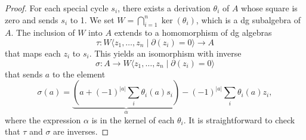 \documentclass[10pt,a4paper]{amsart}
\begin{document}
\begin{proof}
    For each special cycle $s_i$, there exists a derivation $\theta_i$ of $A$ whose square is zero and sends $s_i$ to 1. We set $W = \bigcap_{i=1}^{n} \ker(\theta_i)$, which is a dg subalgebra of $A$. The inclusion of $W$ into $A$ extends to a homomorphism of dg algebras 
    \[
    \tau: W\langle z_1, \ldots, z_n \mid \partial(z_i)=0 \rangle \to A
    \]
    that  maps each $z_i$ to $s_i$. This yields an isomorphism with inverse
    \[ 
    \sigma: A \to W\langle z_1, \ldots, z_n \mid \partial(z_i)=0 \rangle
    \]
    that sends $a$ to the element
    \[
    \sigma(a)= \underbrace{(a + (-1)^{|a|} \sum_{i}\theta_i(a)s_i)}_{\alpha} - (-1)^{|a|} \sum_i \theta_i(a)z_i,
    \]
    where the expression $\alpha$ is in the kernel of each $\theta_i$.
    It is straightforward to check that $\tau$ and $\sigma$ are inverses.
\end{proof}
\end{document}
